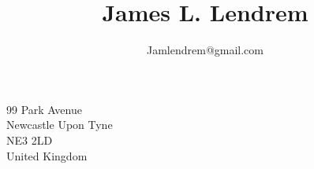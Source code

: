 \documentclass[10pt]{article}
\title{\bfseries\Huge James L. Lendrem}
\author{Jamlendrem@gmail.com}
\date{}
\begin{document}
\maketitle

\begin{minipage}[ht]{0.48\textwidth}
99 Park Avenue\\
Newcastle Upon Tyne\\
NE3 2LD\\
United Kingdom\\
\end{minipage}
\end{document}
